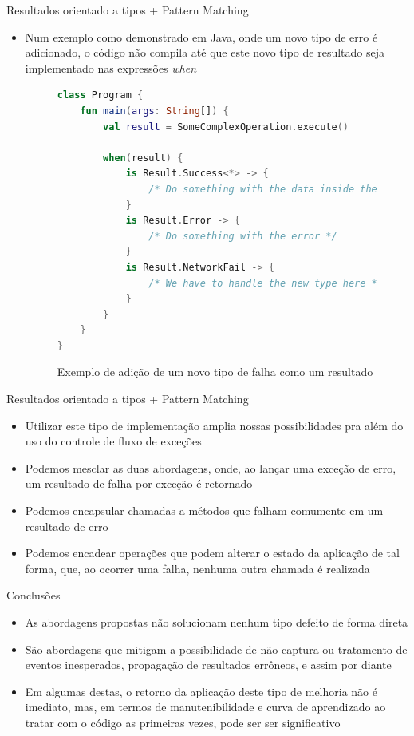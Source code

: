 \documentclass[brazilian]{beamer}
\begin{document}
\begin{frame}[fragile]{Resultados orientado a tipos + Pattern Matching}
    \begin{itemize}
        \item Num exemplo como demonstrado em Java, onde um novo tipo de erro é adicionado, o código não compila até que este novo tipo de resultado seja implementado nas expressões \emph{when}
        \begin{figure}[H]
            \centering
            \begin{lstlisting}[language=Kotlin]
class Program {
    fun main(args: String[]) {
        val result = SomeComplexOperation.execute()

        when(result) {
            is Result.Success<*> -> {
                /* Do something with the data inside the success object */
            }
            is Result.Error -> {
                /* Do something with the error */
            }
            is Result.NetworkFail -> {
                /* We have to handle the new type here */
            }
        }
    }
}
            \end{lstlisting}
            \caption{Exemplo de adição de um novo tipo de falha como um resultado}
            \label{fig:kotlin_result_class_example_with_new_type}
        \end{figure}
    \end{itemize}
\end{frame}

\begin{frame}{Resultados orientado a tipos + Pattern Matching}
    \begin{itemize}
        \item Utilizar este tipo de implementação amplia nossas possibilidades pra além do uso do controle de fluxo de exceções
        \item Podemos mesclar as duas abordagens, onde, ao lançar uma exceção de erro, um resultado de falha por exceção é retornado
        \item Podemos encapsular chamadas a métodos que falham comumente em um resultado de erro
        \item Podemos encadear operações que podem alterar o estado da aplicação de tal forma, que, ao ocorrer uma falha, nenhuma outra chamada é realizada
    \end{itemize}
\end{frame}

\begin{frame}{Conclusões}
    \begin{itemize}
        \item As abordagens propostas não solucionam nenhum tipo defeito de forma direta
        \item São abordagens que mitigam a possibilidade de não captura ou tratamento de eventos inesperados, propagação de resultados errôneos, e assim por diante
        \item Em algumas destas, o retorno da aplicação deste tipo de melhoria não é imediato, mas, em termos de manutenibilidade e curva de aprendizado ao tratar com o código as primeiras vezes, pode ser ser significativo
    \end{itemize}
\end{frame}
\end{document}
